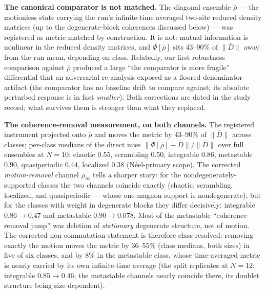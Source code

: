 \documentclass[a4paper,11pt,noarxiv]{quantumarticle}
\begin{document}
\textbf{The canonical comparator is not matched.} The diagonal ensemble
$\bar\rho$ --- the motionless state carrying the run's infinite-time
averaged two-site reduced density matrices (up to the degenerate-block
coherences discussed below) --- was registered as metric-matched
by construction. It is not: mutual information is nonlinear in the
reduced density matrices, and $\Phi[\bar\rho]$ sits $43$--$90\%$ of
$\lVert\bar D\rVert$ away from the run mean, depending on class.
Relatedly, our first robustness comparison against $\bar\rho$ produced
a large ``the comparator is more fragile'' differential that an
adversarial re-analysis exposed as a floored-denominator artifact (the
comparator has no baseline drift to compare against; its absolute
perturbed response is in fact \emph{smaller}). Both corrections are
dated in the study record; what survives them is stronger than what
they replaced.

\textbf{The coherence-removal measurement, on both channels.} The
registered instrument projected onto $\bar\rho$ and moves the metric
by $43$--$90\%$ of $\lVert\bar D\rVert$ across classes; per-class
medians of the direct miss
$\lVert\Phi[\bar\rho]-\bar D\rVert/\lVert\bar D\rVert$ over full
ensembles at $N{=}10$: chaotic $0.55$, scrambling $0.50$, integrable
$0.86$, metastable $0.90$, quasiperiodic $0.44$, localized $0.38$
(N\'eel-primary scope). The corrected \emph{motion-removal} channel
$\rho_\infty$ tells a sharper story: for the nondegenerately-supported
classes the two channels coincide exactly (chaotic, scrambling,
localized, and quasiperiodic --- whose one-magnon support is
nondegenerate), but for the classes with weight in degenerate blocks
they differ decisively: integrable $0.86 \to 0.47$ and metastable
$0.90 \to 0.078$. Most of the metastable ``coherence-removal jump''
was deletion of \emph{stationary} degenerate structure, not of motion.
The corrected non-commutation statement is therefore class-resolved:
removing exactly the motion moves the metric by $36$--$55\%$ (class
medians, both sizes) in five of six classes, and by $8\%$ in the
metastable class, whose time-averaged metric is nearly carried by its
own infinite-time average (the split replicates at $N{=}12$:
integrable $0.85 \to 0.46$; the metastable channels nearly coincide
there, its doublet structure being size-dependent).
\end{document}
